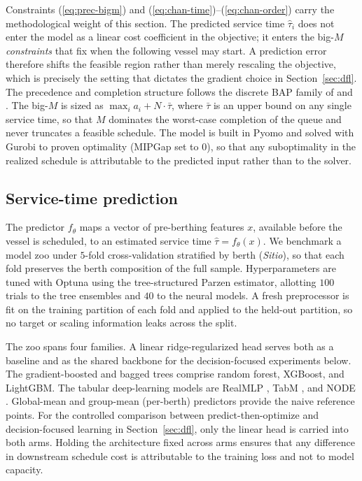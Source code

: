 Constraints (\ref{eq:prec-bigm}) and (\ref{eq:chan-time})--(\ref{eq:chan-order})
carry the methodological weight of this section. The predicted service time
$\hat\tau_i$ does not enter the model as a linear cost coefficient in the
objective; it enters the big-$M$ \emph{constraints} that fix when the following
vessel may start. A prediction error therefore shifts the feasible region rather
than merely rescaling the objective, which is precisely the setting that dictates
the gradient choice in Section~\ref{sec:dfl}. The precedence and completion
structure follows the discrete BAP family of \citet{cordeau2005berth} and
\citet{buhrkal2011models}. The big-$M$ is sized as $\max_i a_i + N\cdot\bar\tau$,
where $\bar\tau$ is an upper bound on any single service time, so that
$M$ dominates the worst-case completion of the queue and never truncates a
feasible schedule. The model is built in Pyomo and solved with Gurobi to proven
optimality (MIPGap set to $0$), so that any suboptimality in the realized
schedule is attributable to the predicted input rather than to the solver.

\subsection{Service-time prediction}\label{sec:predictors}

The predictor $f_\theta$ maps a vector of pre-berthing features $x$, available
before the vessel is scheduled, to an estimated service time $\hat\tau=f_\theta(x)$.
We benchmark a model zoo under $5$-fold cross-validation stratified by berth
(\emph{Sitio}), so that each fold preserves the berth composition of the full
sample. Hyperparameters are tuned with Optuna using the tree-structured Parzen
estimator, allotting $100$ trials to the tree ensembles and $40$ to the neural
models. A fresh preprocessor is fit on the training partition of each fold and
applied to the held-out partition, so no target or scaling information leaks
across the split.

The zoo spans four families. A linear ridge-regularized head serves both as a
baseline and as the shared backbone for the decision-focused experiments below.
The gradient-boosted and bagged trees comprise random forest, XGBoost, and
LightGBM. The tabular deep-learning models are RealMLP \citep{holzmuller2024realmlp},
TabM \citep{gorishniy2025tabm}, and NODE \citep{popov2020node}. Global-mean and
group-mean (per-berth) predictors provide the naive reference points. For the
controlled comparison between predict-then-optimize and decision-focused learning
in Section~\ref{sec:dfl}, only the linear head is carried into both arms. Holding
the architecture fixed across arms ensures that any difference in downstream
schedule cost is attributable to the training loss and not to model capacity.


